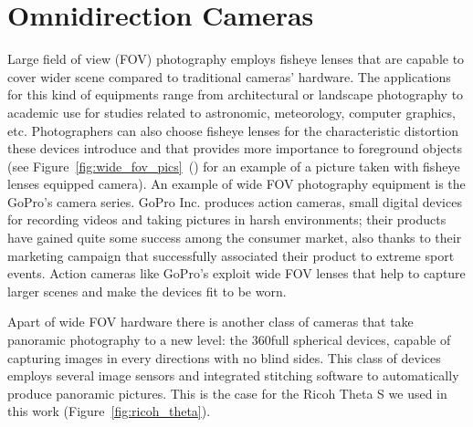 \section{Omnidirection Cameras}
Large field of view (FOV) photography employs fisheye lenses that are capable to cover 
wider scene compared to traditional cameras' hardware.
The applications for this kind of equipments range from architectural or 
landscape photography to academic use for studies related to astronomic, 
meteorology, computer graphics, etc.
Photographers can also choose fisheye lenses for the characteristic distortion
these devices introduce and that provides more importance to foreground objects
(see Figure~\ref{fig:wide_fov_pics}~() for an 
example of a picture taken with fisheye lenses equipped camera).
An example of wide FOV photography equipment is the GoPro\registered's camera series.
GoPro Inc\registered. produces action cameras, small digital devices for recording videos 
and taking pictures in harsh environments; their products have gained quite 
some success among the consumer market, also thanks to their marketing campaign 
that successfully associated their product to extreme sport events.
Action cameras like GoPro\registered's exploit wide FOV lenses that help to capture larger
scenes and make the devices fit to be worn.

Apart of wide FOV hardware there is another class of  
cameras that take panoramic photography to a new level: 
the 360\degree full spherical devices, capable of capturing images
in every directions with no blind sides. This class of devices employs 
several image sensors and integrated stitching software to automatically produce
panoramic pictures. This is the case for the Ricoh Theta S\texttrademark 
\cite{theta_website} we used in this work (Figure~\ref{fig:ricoh_theta}).

